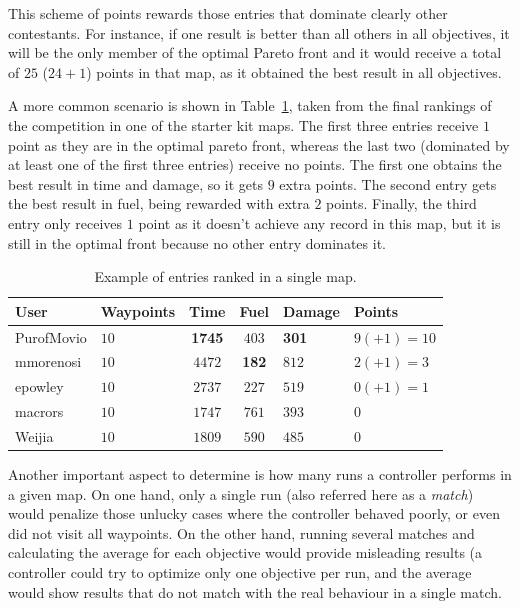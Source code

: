 \documentclass[conference]{IEEEtran}
\begin{document}
This scheme of points rewards those entries that dominate clearly other contestants. For instance, if one result is better than all others in all objectives, it will be the only member of the optimal Pareto front and it would receive a total of $25$ ($24 + 1$) points in that map, as it obtained the best result in all objectives.

A more common scenario is shown in Table~\ref{tab:rankingSample}, taken from the final rankings of the competition in one of the starter kit maps. The first three entries receive $1$ point as they are in the optimal pareto front, whereas the last two (dominated by at least one of the first three entries) receive no points. The first one obtains the best result in time and damage, so it gets $9$ extra points. The second entry gets the best result in fuel, being rewarded with extra $2$ points. Finally, the third entry only receives $1$ point as it doesn't achieve any record in this map, but it is still in the optimal front because no other entry dominates it.

\begin{table}[!t]
\begin{center}
\begin{tabular}{|>{\centering\arraybackslash}m{1.25cm}|>{\centering\arraybackslash}m{1.15cm}|c|c|>{\centering\arraybackslash}m{0.9cm}|>{\centering\arraybackslash}m{1.5cm}|}
\hline
 \textbf{User} & \textbf{Waypoints} & \textbf{Time} & \textbf{Fuel} & \textbf{Damage} & \textbf{Points} \\ 
\hline
PurofMovio & $10$ & \textbf{1745} & $403$ & \textbf{301} & $9 (+1) = 10$\\
\hline
mmorenosi & $10$ & $4472$ & \textbf{182} & $812$ & $2 (+1) = 3$\\
\hline
epowley & $10$ & $2737$ & $227$ & $519$ & $0 (+1) = 1$\\
\hline
\hline
macrors & $10$ & $1747$ & $761$ & $393$ & $0$\\
\hline
Weijia & $10$ & $1809$ & $590$ & $485$ & $0$\\
\hline
\end{tabular}
\caption{Example of entries ranked in a single map. }
\label{tab:rankingSample}
\end{center}
\end{table}

Another important aspect to determine is how many runs a controller performs in a given map. On one hand, only a single run (also referred here as a \textit{match}) would penalize those unlucky cases where the controller behaved poorly, or even did not visit all waypoints. On the other hand, running several matches and calculating the average for each objective would provide misleading results (a controller could try to optimize only one objective per run, and the average would show results that do not match with the real behaviour in a single match.
\end{document}
